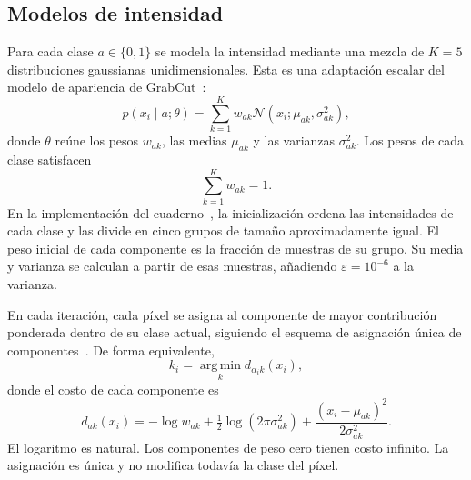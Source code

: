 \subsection{Modelos de intensidad}

Para cada clase $a\in\{0,1\}$ se modela la intensidad mediante una mezcla
de $K=5$ distribuciones gaussianas unidimensionales. Esta es una
adaptación escalar del modelo de apariencia de GrabCut~\cite{rother2004}:
\begin{equation}
 p(x_i\mid a;\theta)=\sum_{k=1}^{K}w_{ak}
 \mathcal{N}(x_i;\mu_{ak},\sigma_{ak}^{2}),
 \label{eq:mezcla}
\end{equation}
donde $\theta$ reúne los pesos $w_{ak}$, las medias $\mu_{ak}$ y las
varianzas $\sigma_{ak}^{2}$. Los pesos de cada clase satisfacen
\begin{equation}
 \sum_{k=1}^{K}w_{ak}=1.
 \label{eq:normalizacion-pesos}
\end{equation}
En la implementación del cuaderno~\cite{cuaderno}, la inicialización
ordena las intensidades de
cada clase y las divide en cinco grupos de tamaño aproximadamente igual.
El peso inicial de cada componente es la fracción de muestras de su grupo.
Su media y varianza se calculan a partir de esas muestras, añadiendo
$\varepsilon=10^{-6}$ a la varianza.

En cada iteración, cada píxel se asigna al componente de mayor contribución
ponderada dentro de su clase actual, siguiendo el esquema de asignación
única de componentes~\cite{rother2004}. De forma equivalente,
\begin{equation}
 k_i=\operatorname*{arg\,min}_{k}d_{\alpha_i k}(x_i),
\end{equation}
donde el costo de cada componente es
\begin{equation}
 d_{ak}(x_i)=-\log w_{ak}+\tfrac12\log(2\pi\sigma_{ak}^{2})
 +\frac{(x_i-\mu_{ak})^2}{2\sigma_{ak}^{2}}.
\end{equation}
El logaritmo es natural. Los componentes de peso cero tienen costo infinito.
La asignación es única y no modifica todavía la clase del píxel.

